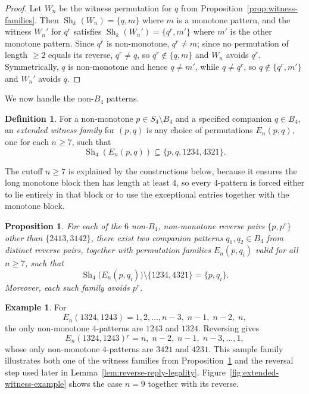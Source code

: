 \documentclass[11pt]{amsart}
\newcommand{\Sym}{S}
\newcommand{\Sh}{\operatorname{Sh}}
\theoremstyle{plain}
\newtheorem{proposition}[theorem]{Proposition}
\theoremstyle{definition}
\newtheorem{definition}[theorem]{Definition}
\newtheorem{example}[theorem]{Example}
\theoremstyle{remark}
\begin{document}
\begin{proof}
  Let $W_n$ be the witness permutation for $q$ from Proposition~\ref{prop:witness-families}.  Then
  $\Sh_k(W_n) = \{q, m\}$ where $m$ is a monotone pattern, and the witness $W_n'$ for $q^r$
  satisfies $\Sh_k(W_n') = \{q^r, m'\}$ where $m'$ is the other monotone pattern.  Since $q^r$ is
  non-monotone, $q^r \neq m$; since no permutation of length $\geq 2$ equals its
  reverse, $q^r \neq q$, so $q^r \notin \{q, m\}$ and $W_n$ avoids $q^r$.  Symmetrically, $q$ is
  non-monotone and hence $q \neq m'$, while $q \neq q^r$, so $q \notin \{q^r, m'\}$ and
  $W_n'$ avoids $q$.
\end{proof}

We now handle the non-$B_4$ patterns.

\begin{definition} \label{def:extended-witness-family}
  For a non-monotone $p \in \Sym_4 \setminus B_4$ and a specified companion $q \in B_4$, an
  \emph{extended witness family} for $(p,q)$ is any choice of permutations $E_n(p,q)$, one for each
  $n \geq 7$, such that
  \[
    \Sh_4(E_n(p,q)) \subseteq \{p, q, 1234, 4321\}.
  \]
\end{definition}
The cutoff $n \geq 7$ is explained by the constructions below, because it ensures
the long monotone block then has length at least $4$, so every $4$-pattern is forced either to lie
entirely in that block or to use the exceptional entries together with the monotone block.

\begin{proposition}\label{prop:extended-witnesses}
  For each of the $6$ non-$B_4$, non-monotone reverse pairs $\{p,p^r\}$ other than
  $\{2413,3142\}$, there exist two companion patterns $q_1, q_2 \in B_4$ from
  distinct reverse pairs, together with permutation families $E_n(p,q_i)$ valid for all
  $n \geq 7$, such that
  \[
    \Sh_4\bigl(E_n(p,q_i)\bigr) \setminus \{1234,4321\} = \{p, q_i\}.
  \]
  Moreover, each such family avoids $p^r$.
\end{proposition}

\begin{example}
  For
  \[
    E_n(1324,1243)=1,2,\ldots,n-3,\; n-1,\; n-2,\; n,
  \]
  the only non-monotone $4$-patterns are $1243$ and $1324$.  Reversing gives
  \[
    E_n(1324,1243){}^r=n,\; n-2,\; n-1,\; n-3,\ldots,1,
  \]
  whose only non-monotone $4$-patterns are $3421$ and $4231$.  This sample family illustrates both
  one of the witness families from Proposition~\ref{prop:extended-witnesses} and the
  reversal step used later in
  Lemma~\ref{lem:reverse-reply-legality}.  Figure~\ref{fig:extended-witness-example} shows the case
  $n=9$ together with its reverse.
\end{example}
\end{document}
